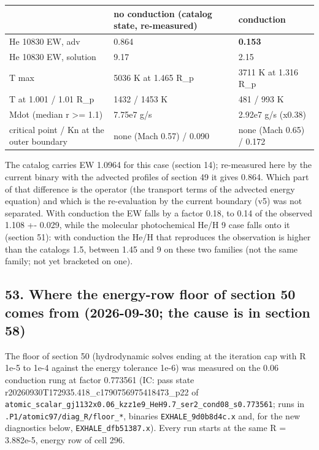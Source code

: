 \documentclass[english,a4paper]{my_memo}
\begin{document}
{\def\LTcaptype{none} %
{\small
\begin{longtable}[]{@{}lll@{}}
\toprule\noalign{}
& no conduction (catalog state, re-measured) & conduction \\
\midrule\noalign{}
\endhead
\bottomrule\noalign{}
\endlastfoot
He 10830 EW, adv & 0.864 & \textbf{0.153} \\
He 10830 EW, solution & 9.17 & 2.15 \\
T max & 5036 K at 1.465 R\_p & 3711 K at 1.316 R\_p \\
T at 1.001 / 1.01 R\_p & 1432 / 1453 K & 481 / 993 K \\
Mdot (median r \textgreater= 1.1) & 7.75e7 g/s & 2.92e7 g/s (x0.38) \\
critical point / Kn at the outer boundary & none (Mach 0.57) / 0.090 & none (Mach 0.65) / 0.172 \\
\end{longtable}
}
}

The catalog carries EW 1.0964 for this case (section 14); re-measured here
by the current binary with the advected profiles of section 49 it gives
0.864. Which part of that difference is the operator (the transport terms of
the advected energy equation) and which is the re-evaluation by the current
boundary (v5) was not separated. With conduction the EW falls by a factor
0.18, to 0.14 of the observed 1.108 +- 0.029, while the molecular
photochemical He/H 9 case falls onto it (section 51): with conduction the
He/H that reproduces the observation is higher than the catalog\textquotesingle s 1.5,
between 1.45 and 9 on these two families (not the same family; not yet
bracketed on one).

\subsection{53. Where the energy-row floor of section 50 comes from (2026-09-30; the cause is in section 58)}\label{53-where-the-energy-row-floor-of-section-50-comes-from-2026-09-30-the-cause-is-in-section-58}

The floor of section 50 (hydrodynamic solves ending at the iteration cap
with \textbar\textbar R\textbar\textbar{} 1e-5 to 1e-4 against the energy tolerance 1e-6) was measured on
the 0.06 conduction rung at factor 0.773561 (IC: pass state
r20260930T172935.418\_c1790756975418473\_p22 of
\texttt{atomic\_scalar\_gj1132x0.06\_kzz1e9\_HeH9.7\_ser2\_cond08\_s0.773561}; runs in
\texttt{.P1/atomic97/diag\_R/floor\_*}, binaries \texttt{EXHALE\_9d0b8d4c.x} and, for the
new diagnostics below, \texttt{EXHALE\_dfb51387.x}). Every run starts at the same
\textbar\textbar R\textbar\textbar{} = 3.882e-5, energy row of cell 296.
\end{document}
